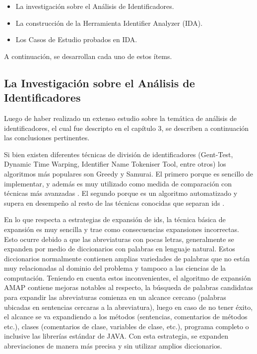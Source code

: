 \begin{itemize}

\item La investigación sobre el Análisis de Identificadores.

\item La construcción de la Herramienta Identifier Analyzer (IDA).

\item Los Casos de Estudio probados en IDA.

\end{itemize}

A continuación, se desarrollan cada uno de estos ítems.

\subsection{La Investigación sobre el Análisis de\\ Identificadores}

Luego de haber realizado un extenso estudio sobre la temática de análisis de identificadores, el cual fue descripto en el capítulo 3, se describen a continuación las conclusiones pertinentes.

Si bien existen diferentes técnicas de división de identificadores (Gent-Test, Dynamic Time Warping,  Identifier Name Tokeniser Tool, entre otros) los algoritmos más populares son Greedy y Samurai. El primero porque es sencillo de implementar, y además es muy utilizado como medida de comparación con técnicas más avanzadas \cite{DLFB06,FBL06,HDD06}. El segundo porque es un algoritmo automatizado y supera en desempeño al resto de las técnicas conocidas que separan ids \cite{EHPV09}.

En lo que respecta a estrategias de expansión de ids, la técnica básica de expansión es muy sencilla y trae como consecuencias expansiones incorrectas. Esto ocurre debido a que las abreviaturas con pocas letras, generalmente se expanden por medio de diccionarios con palabras en lenguaje natural. Estos diccionarios normalmente contienen amplias variedades de palabras que no están muy relacionadas al dominio del problema y tampoco a las ciencias de la computación.
Teniendo en cuenta estos inconvenientes, el algoritmo de expansión AMAP \cite{EZH08} contiene mejoras notables al respecto, la búsqueda de palabras candidatas para expandir las abreviaturas comienza en un alcance cercano (palabras ubicadas en sentencias cercaras a la abreviatura), luego en caso de no tener éxito, el alcance se va expandiendo a los métodos (sentencias, comentarios de métodos etc.), clases (comentarios de clase, variables de clase, etc.), programa completo o inclusive las librerías estándar de JAVA. Con esta estrategia, se expanden abreviaciones de manera más precisa y sin utilizar amplios diccionarios.

